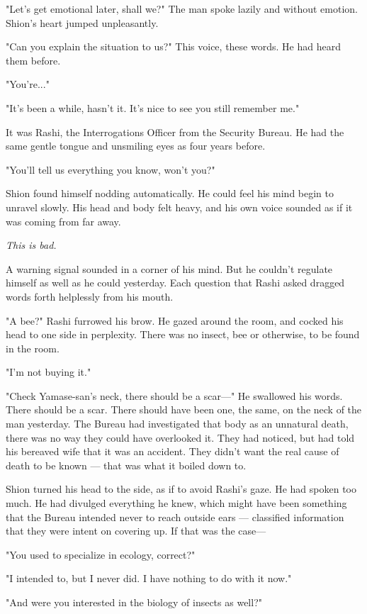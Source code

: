 "Let's get emotional later, shall we?" The man spoke lazily and without
emotion. Shion's heart jumped unpleasantly.

"Can you explain the situation to us?" This voice, these words. He had
heard them before.

"You're..."

"It's been a while, hasn't it. It's nice to see you still remember me."

It was Rashi, the Interrogations Officer from the Security Bureau. He
had the same gentle tongue and unsmiling eyes as four years before.

"You'll tell us everything you know, won't you?"

Shion found himself nodding automatically. He could feel his mind begin
to unravel slowly. His head and body felt heavy, and his own voice
sounded as if it was coming from far away.

\emph{This is bad.}

A warning signal sounded in a corner of his mind. But he couldn't
regulate himself as well as he could yesterday. Each question that Rashi
asked dragged words forth helplessly from his mouth.

"A bee?" Rashi furrowed his brow. He gazed around the room, and cocked
his head to one side in perplexity. There was no insect, bee or
otherwise, to be found in the room.

"I'm not buying it."

"Check Yamase-san's neck, there should be a scar---" He swallowed his
words. There should be a scar. There should have been one, the same, on
the neck of the man yesterday. The Bureau had investigated that body as
an unnatural death, there was no way they could have overlooked it. They
had noticed, but had told his bereaved wife that it was an accident.
They didn't want the real cause of death to be known --- that was what it
boiled down to.

Shion turned his head to the side, as if to avoid Rashi's gaze. He had
spoken too much. He had divulged everything he knew, which might have
been something that the Bureau intended never to reach outside ears ---
classified information that they were intent on covering up. If that was
the case---

"You used to specialize in ecology, correct?"

"I intended to, but I never did. I have nothing to do with it now."

"And were you interested in the biology of insects as well?"

